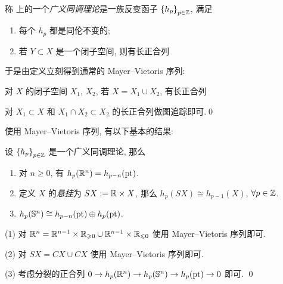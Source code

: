 \begin{Definition}[广义同调理论]
	称  上的一个\emph{广义同调理论}是一族反变函子 $ \set{h_p}_{p\in\Z} $, 满足
	\begin{enumerate}
		\item 每个 $ h_p $ 都是同伦不变的;
		\item 若 $ Y\subset X $ 是一个闭子空间, 则有长正合列
		\begin{center}
		\end{center}
	\end{enumerate}
\end{Definition}

于是由定义立刻得到通常的 Mayer--Vietoris 序列:

\begin{Proposition}
	对 $ X $ 的闭子空间 $ X_1 $, $ X_2 $, 若 $ X=X_1\cup X_2 $, 有长正合列
	\begin{center}
	\end{center}
\end{Proposition}
\begin{Proof}
	对 $ X_1\subset X $ 和 $ X_1\cap X_2\subset X_2 $ 的长正合列做图追踪即可.\qed
\end{Proof}

使用 Mayer--Vietoris 序列, 有以下基本的结果:

\begin{Proposition}
	设 $ \set{h_p}_{p\in\Z} $ 是一个广义同调理论, 那么
	\begin{enumerate}
		\item 对 $ n\geqslant 0 $, 有 $ h_p(\R^n)=h_{p-n}(\mathrm{pt}) $.
		\item 定义 $ X $ 的\emph{悬挂}为 $ SX:=\R\times X $, 那么 $ h_p(SX)\cong h_{p-1}(X) $, $ \forall p\in\Z $.
		\item $ h_p(\S^n)\cong h_{p-n}(\mathrm{pt})\oplus h_p(\mathrm{pt}) $.
	\end{enumerate}
\end{Proposition}
\begin{Proof}
	(1) 对 $ \R^n=\R^{n-1}\times\R_{\geqslant 0}\cup\R^{n-1}\times\R_{\leqslant 0} $ 使用 Mayer--Vietoris 序列即可.
	
	(2) 对 $ SX=CX\cup CX $ 使用 Mayer--Vietoris 序列即可.

	(3) 考虑分裂的正合列 $ 0\to h_p(\R^n)\to h_p(\S^n)\to h_p(\mathrm{pt})\to 0 $ 即可.	\qed
\end{Proof}

